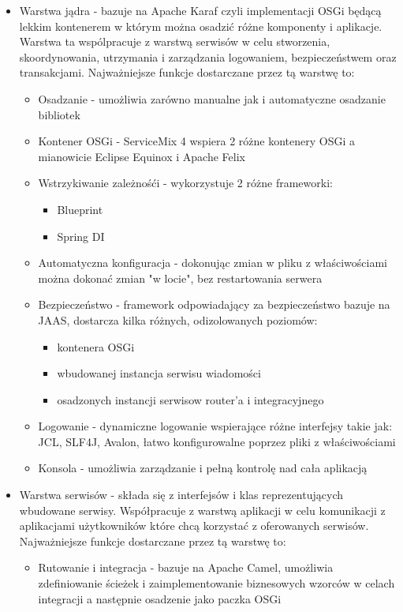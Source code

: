 \begin{itemize}
	\item Warstwa jądra - bazuje na Apache Karaf czyli implementacji OSGi będącą lekkim kontenerem w którym można osadzić różne komponenty i aplikacje. Warstwa ta wspólpracuje z warstwą serwisów w celu stworzenia, skoordynowania, utrzymania i zarządzania logowaniem, bezpieczeństwem oraz transakcjami. Najważniejsze funkcje dostarczane przez tą warstwę to:
	\begin{itemize}
		\item Osadzanie - umożliwia zarówno manualne jak i automatyczne osadzanie bibliotek
		\item Kontener OSGi - ServiceMix 4 wspiera 2 różne kontenery OSGi a mianowicie Eclipse Equinox i Apache Felix
		\item Wstrzykiwanie zależnośći - wykorzystuje 2 różne frameworki:
			\begin{itemize}
				\item Blueprint
				\item Spring DI
			\end{itemize}   
		\item Automatyczna konfiguracja - dokonując zmian w pliku z właściwościami można dokonać zmian "w locie", bez restartowania serwera
		\item Bezpieczeństwo - framework odpowiadający za bezpieczeństwo bazuje na JAAS, dostarcza kilka różnych, odizolowanych poziomów:
			\begin{itemize}
				\item kontenera OSGi
				\item wbudowanej instancja serwisu wiadomości
				\item osadzonych instancji serwisow router'a i integracyjnego
			\end{itemize} 
		\item Logowanie - dynamiczne logowanie wspierające różne interfejsy takie jak: JCL, SLF4J, Avalon, łatwo konfigurowalne poprzez pliki z właściwościami
		\item Konsola - umożliwia zarządzanie i pełną kontrolę nad cała aplikacją
	\end{itemize}  
	\item Warstwa serwisów - 	składa się z interfejsów i klas reprezentujących wbudowane serwisy. Współpracuje z warstwą aplikacji w celu komunikacji z aplikacjami użytkowników które chcą korzystać z oferowanych serwisów. Najważniejsze funkcje dostarczane przez tą warstwę to:
	\begin{itemize}
		\item Rutowanie i integracja - bazuje na Apache Camel, umożliwia zdefiniowanie ścieżek i zaimplementowanie biznesowych wzorców w celach integracji a następnie osadzenie jako paczka OSGi

\end{itemize}
\end{itemize}
